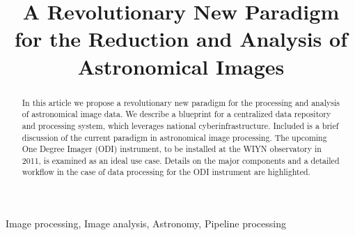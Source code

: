 \documentclass[10pt,conference]{IEEEtran}
\begin{document}
\title{A Revolutionary New Paradigm for the Reduction and Analysis of Astronomical Images}


\author{
}


\maketitle


\begin{abstract}
In this article we propose a revolutionary new paradigm for the processing and analysis of astronomical image data. We describe a blueprint for a centralized data repository and processing system, which leverages national cyberinfrastructure. Included is a brief discussion of the current paradigm in astronomical image processing. The upcoming One Degree Imager (ODI) instrument, to be installed at the WIYN observatory in 2011, is examined as an ideal use case. Details on the major components and a detailed workflow in the case of data processing for the ODI instrument are highlighted. 
\end{abstract}

\begin{IEEEkeywords}
Image processing, Image analysis, Astronomy, Pipeline processing
\end{IEEEkeywords}
\end{document}
